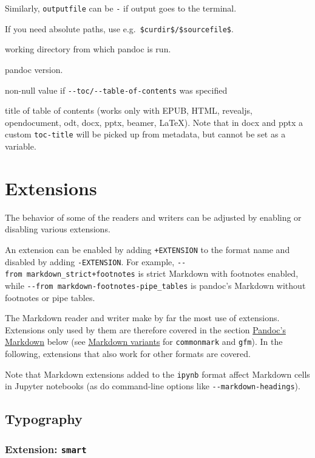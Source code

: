 \documentclass[
  b5paper
]{book}
\begin{document}
\begin{description}
Similarly, \texttt{outputfile} can be \texttt{-} if output goes to the
terminal.

If you need absolute paths, use e.g.~\texttt{\$curdir\$/\$sourcefile\$}.
\item[\texttt{curdir}]
working directory from which pandoc is run.
\item[\texttt{pandoc-version}]
pandoc version.
\item[\texttt{toc}]
non-null value if \texttt{-\/-toc/-\/-table-of-contents} was specified
\item[\texttt{toc-title}]
title of table of contents (works only with EPUB, HTML, revealjs,
opendocument, odt, docx, pptx, beamer, LaTeX). Note that in docx and
pptx a custom \texttt{toc-title} will be picked up from metadata, but
cannot be set as a variable.
\end{description}

\chapter{Extensions}\label{extensions}

The behavior of some of the readers and writers can be adjusted by
enabling or disabling various extensions.

An extension can be enabled by adding \texttt{+EXTENSION} to the format
name and disabled by adding \texttt{-EXTENSION}. For example,
\texttt{-\/-from\ markdown\_strict+footnotes} is strict Markdown with
footnotes enabled, while
\texttt{-\/-from\ markdown-footnotes-pipe\_tables} is pandoc's Markdown
without footnotes or pipe tables.

The Markdown reader and writer make by far the most use of extensions.
Extensions only used by them are therefore covered in the section
\hyperref[pandocs-markdown]{Pandoc's Markdown} below (see
\hyperref[markdown-variants]{Markdown variants} for \texttt{commonmark}
and \texttt{gfm}). In the following, extensions that also work for other
formats are covered.

Note that Markdown extensions added to the \texttt{ipynb} format affect
Markdown cells in Jupyter notebooks (as do command-line options like
\texttt{-\/-markdown-headings}).

\section{Typography}\label{typography}

\subsection{\texorpdfstring{Extension:
\texttt{smart}}{Extension: smart}}\label{extension-smart}
\end{document}
